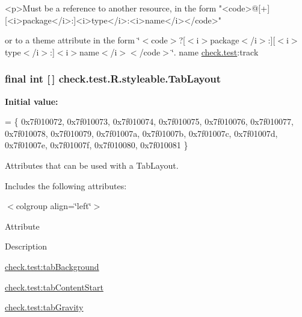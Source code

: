 \begin{DoxyVerb}      <p>Must be a reference to another resource, in the form "<code>@[+][<i>package</i>:]<i>type</i>:<i>name</i></code>"
\end{DoxyVerb}
 or to a theme attribute in the form \char`\"{}$<$code$>$?\mbox{[}$<$i$>$package$<$/i$>$\+:\mbox{]}\mbox{[}$<$i$>$type$<$/i$>$\+:\mbox{]}$<$i$>$name$<$/i$>$$<$/code$>$\char`\"{}.  name \hyperlink{namespacecheck_1_1test}{check.\+test}\+:track \hypertarget{classcheck_1_1test_1_1_r_1_1styleable_a2a3232e8d38a43f5131a16385abbbed8}{}
\subsubsection[{Tab\+Layout}]{\setlength{\rightskip}{0pt plus 5cm}final int \mbox{[}$\,$\mbox{]} check.\+test.\+R.\+styleable.\+Tab\+Layout\hspace{0.3cm}{\ttfamily [static]}}\label{classcheck_1_1test_1_1_r_1_1styleable_a2a3232e8d38a43f5131a16385abbbed8}
{\bfseries Initial value\+:}
\begin{DoxyCode}
= \{
            0x7f010072, 0x7f010073, 0x7f010074, 0x7f010075,
            0x7f010076, 0x7f010077, 0x7f010078, 0x7f010079,
            0x7f01007a, 0x7f01007b, 0x7f01007c, 0x7f01007d,
            0x7f01007e, 0x7f01007f, 0x7f010080, 0x7f010081
        \}
\end{DoxyCode}
Attributes that can be used with a Tab\+Layout. 

Includes the following attributes\+:

\begin{TabularC}{0}
\hline
\end{TabularC}
$<$colgroup align=\char`\"{}left\char`\"{}$>$ 

Attribute

Description 

{\ttfamily \hyperlink{classcheck_1_1test_1_1_r_1_1styleable_a841fbc3f9478cc8cb55372aafdab6dcb}{check.\+test\+:tab\+Background}}

{\ttfamily \hyperlink{classcheck_1_1test_1_1_r_1_1styleable_acfca4d1abebaf4cd27f1340340be23dc}{check.\+test\+:tab\+Content\+Start}}

{\ttfamily \hyperlink{classcheck_1_1test_1_1_r_1_1styleable_a32ac466824c24a1fb95264589256c0a3}{check.\+test\+:tab\+Gravity}}

